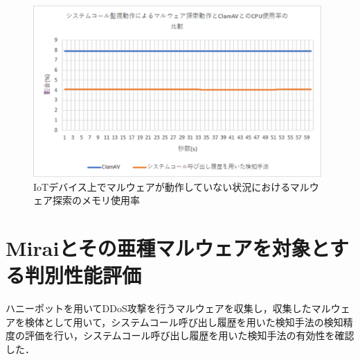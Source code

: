 \begin{figure}[h]
        \centering
           \includegraphics[width=110mm]{figures/strace_mem.eps}
        \caption{IoTデバイス上でマルウェアが動作していない状況におけるマルウェア探索のメモリ使用率}
        \label{fig:strace_mem}
\end{figure}
\newpage
\section{Miraiとその亜種マルウェアを対象とする判別性能評価}
ハニーポットを用いてDDoS攻撃を行うマルウェアを収集し，収集したマルウェアを検体として用いて，システムコール呼び出し履歴を用いた検知手法の検知精度の評価を行い，システムコール呼び出し履歴を用いた検知手法の有効性を確認した．

